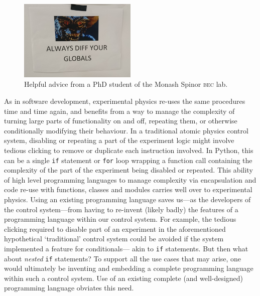 \begin{figure}
\begin{center}
\includegraphics[width=0.5\textwidth]{figures/software/globals_diff.png}
\caption{Helpful advice from a PhD student of the Monash Spinor \textsc{bec} lab.}\label{fig:globals_diff}
\end{center}
\end{figure}

As in software development, experimental physics re-uses the same procedures time and time again, and benefits from a way to manage the complexity of turning large parts of functionality on and off, repeating them, or otherwise conditionally modifying their behaviour. In a traditional atomic physics control system, disabling or repeating a part of the experiment logic might involve tedious clicking to remove or duplicate each instruction involved. In Python, this can be a single \texttt{if} statement or \texttt{for} loop wrapping a function call containing the complexity of the part of the experiment being disabled or repeated. This ability of high level programming languages to manage complexity via encapsulation and code re-use with functions, classes and modules carries well over to experimental physics. Using an existing programming language saves us---as the developers of the control system---from having to re-invent (likely badly) the features of a programming language within our control system. For example, the tedious clicking required to disable part of an experiment in the aforementioned hypothetical `traditional' control system could be avoided if the system implemented a feature for conditionals--- akin to \texttt{if} statements. But then what about \emph{nested} \texttt{if} statements? To support all the use cases that may arise, one would ultimately be inventing and embedding a complete programming language within such a control system. Use of an existing complete (and well-designed) programming language obviates this need.

